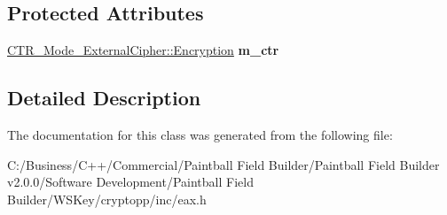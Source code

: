 \subsection*{Protected Attributes}
\begin{DoxyCompactItemize}
\item 
\hypertarget{class_e_a_x___base_a825cd64b1c6107bba9d32a00cad16b26}{
\hyperlink{class_cipher_mode_final_template___external_cipher}{CTR\_\-Mode\_\-ExternalCipher::Encryption} {\bfseries m\_\-ctr}}
\label{class_e_a_x___base_a825cd64b1c6107bba9d32a00cad16b26}

\end{DoxyCompactItemize}


\subsection{Detailed Description}


The documentation for this class was generated from the following file:\begin{DoxyCompactItemize}
\item 
C:/Business/C++/Commercial/Paintball Field Builder/Paintball Field Builder v2.0.0/Software Development/Paintball Field Builder/WSKey/cryptopp/inc/eax.h\end{DoxyCompactItemize}
